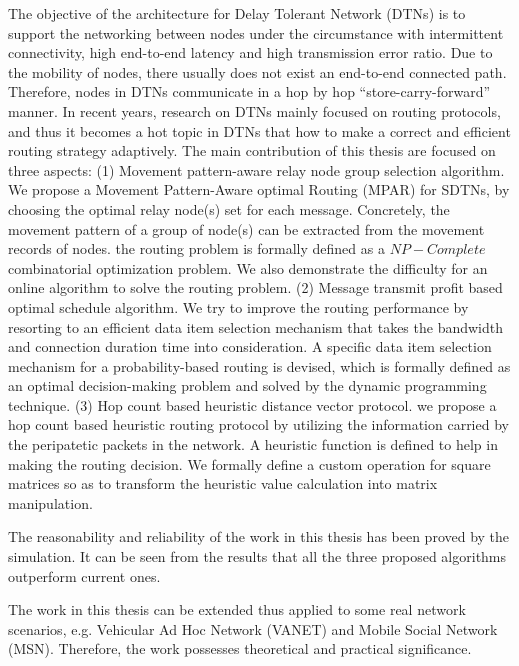 \begin{englishabstract}

The objective of the architecture for Delay Tolerant Network (DTNs) is to support the networking between nodes under the circumstance with intermittent connectivity, high end-to-end latency and high transmission error ratio. Due to the mobility of nodes, there usually does not exist an end-to-end connected path. Therefore, nodes in DTNs communicate in a hop by hop ``store-carry-forward'' manner. In recent years, research on DTNs mainly focused on routing protocols, and thus it becomes a hot topic in DTNs that how to make a correct and efficient routing strategy adaptively. The main contribution of this thesis are focused on three aspects: (1) Movement pattern-aware relay node group selection algorithm. We propose a Movement Pattern-Aware optimal Routing (MPAR) for SDTNs, by choosing the optimal relay node(s) set for each message. Concretely, the movement pattern of a group of node(s) can be extracted from the movement records of nodes. the routing problem is formally defined as a $NP-Complete$ combinatorial optimization problem.
We also demonstrate the difficulty for an online algorithm to solve the routing problem. 
(2) Message transmit profit based optimal schedule algorithm. We try to improve the routing performance by resorting to an efficient data item selection mechanism that takes the bandwidth and connection duration time into consideration. A specific data item selection mechanism for a probability-based routing is devised, which is formally defined as an optimal decision-making problem and solved by the dynamic programming technique. (3) Hop count based heuristic distance vector protocol. we propose a hop count based heuristic routing protocol by utilizing the information carried by the peripatetic packets in the network. A heuristic function is defined to help in making the routing decision. We formally define a custom operation for square matrices so as to transform the heuristic value calculation into matrix manipulation.

The reasonability and reliability of the work in this thesis has been proved by the simulation. It can be seen from the results that all the three proposed algorithms outperform current ones. 

The work in this thesis can be extended thus applied to some real network scenarios, e.g. Vehicular Ad Hoc Network (VANET) and Mobile Social Network (MSN). Therefore, the work possesses theoretical and practical significance.

\begin{figure}[!b]
\end{figure}
\end{englishabstract}
